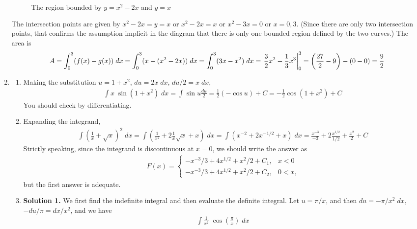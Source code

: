 \documentclass{article}
\begin{document}
\begin{enumerate}
\begin{figure}[htbp]
\begin{center}
    \end{center}
    \caption{The region bounded by $y=x^2-2x$ and $y=x$}
    \label{fig:area}
  \end{figure}
  The intersection points are given by $x^2-2x=y=x$ or $x^2-2x=x$ or $x^2-3x=0$
  or $x=0,3$.  (Since there are only two intersection points, that confirms
  the assumption implicit in the diagram that there is only one bounded
  region defined by the two curves.)  The area is
  \begin{align*}
    A = \int_0^3 (f(x)-g(x)) \; dx
    = \int_0^3 (x - (x^2-2x)) \; dx
    = \int_0^3 (3x-x^2) \; dx
    = \left. \vphantom{\int} \frac{3}{2} x^2 - \frac{1}{3} x^3 \right|_0^3
    = \left(\frac{27}{2} - 9\right) - (0-0)
    = \frac{9}{2}
  \end{align*}
\item 
  \begin{enumerate}
  \item Making the substitution $u=1+x^2$, $du=2x\; dx$, $du/2=x \; dx$,
    \begin{align*}
      \int x \; \sin(1+x^2) \; dx
      = \int \sin u \frac{du}{2}
      = \frac{1}{2} (-\cos u) + C
      = -\frac{1}{2} \cos(1+x^2) + C
    \end{align*}
    You should check by differentiating.
  \item Expanding the integrand,
    \begin{align*}
      \int \left(\frac{1}{x} + \sqrt{x} \right)^2 \; dx
      = \int \left(\frac{1}{x^2} + 2\frac{1}{x} \sqrt{x} + x\right) \; dx
      = \int (x^{-2} + 2 x^{-1/2} + x) \; dx
      = \frac{x^{-3}}{-3} + 2 \frac{x^{1/2}}{1/2} + \frac{x^2}{2} + C
    \end{align*}
    Strictly speaking, since the integrand is discontinuous at $x=0$,
    we should write the answer as
    \begin{align*}
      F(x) = \begin{cases}
        -x^{-3}/3+4x^{1/2}+x^2/2 + C_1, &\mbox{$x<0$} \\
	-x^{-3}/3+4x^{1/2}+x^2/2 + C_2, &\mbox{$0<x$,}
      \end{cases}
    \end{align*}
    but the first answer is adequate.
  \item \textbf{Solution 1.} We first find the indefinite integral and
    then evaluate the definite integral.
    Let $u=\pi/x$, and then $du = -\pi/x^2 \; dx$, $-du/\pi=dx/x^2$, and
    we have 
    \begin{align*}
      \int \frac{1}{x^2} \; \cos\left(\frac{\pi}{x}\right) \; dx

\end{align*}
\end{enumerate}
\end{enumerate}
\end{document}

